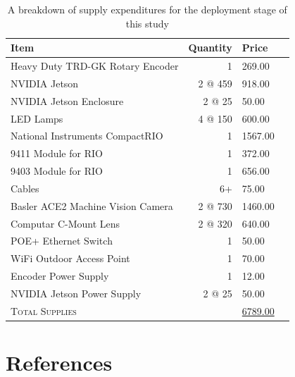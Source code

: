 \documentclass[12pt]{article}
\begin{document}
\begin{table}[H] %
\centering
\begin{tabular}{lrlr}
 	\toprule
 	Item & Quantity & Price \\
 	\midrule
	Heavy Duty TRD-GK Rotary Encoder & 1 & 269.00 \\
	NVIDIA Jetson & 2 @ 459 &918.00 \\
	NVIDIA Jetson Enclosure &2 @ 25 & 50.00 \\
	LED Lamps & 4 @ 150 & 600.00 \\
	National Instruments CompactRIO&1& 1567.00 \\
	9411 Module for RIO &1& 372.00 \\
	9403 Module for RIO &1& 656.00 \\
	Cables &6+& 75.00 \\
	Basler ACE2 Machine Vision Camera &2 @ 730& 1460.00  \\
	Computar C-Mount Lens &2 @ 320& 640.00 \\
	POE+ Ethernet Switch &1& 50.00 \\
	WiFi Outdoor Access Point &1& 70.00 \\
	Encoder Power Supply &1& 12.00 \\
	NVIDIA Jetson Power Supply &2 @ 25& 50.00 \\
	\midrule
	\midrule
	\textsc{Total Supplies}                      & & \underline{6789.00} \\
	\bottomrule
    \bottomrule                
\end{tabular}
\caption[Supply Budget Breakdown]{A breakdown of supply expenditures for the deployment stage of this study}
\label{table:supplies}
\end{table}





%



 


% 
%

\newpage
{
\section{References}
\printbibliography[heading=none]
}
\end{document}
